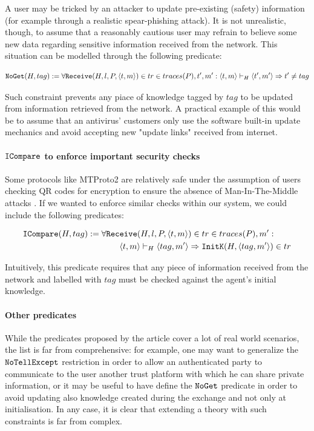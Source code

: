 \documentclass{article}
\newcommand{\mono}[1]{\textrm{\tt #1}}
\begin{document}
A user may be tricked by an attacker to update pre-existing (safety) information (for example through a realistic spear-phishing attack). It is not unrealistic, though, to assume that a reasonably cautious user may refrain to believe some new data regarding sensitive information received from the network. This situation can be modelled through the following predicate:

\begin{equation*}
    \mono{NoGet}(H,tag) := \forall \mono{Receive}(H,l,P,\langle t,m \rangle) \in tr \in traces(P), t', m' : \langle t, m \rangle \vdash_H \langle t', m' \rangle \Rightarrow t' \not = tag
\end{equation*}

Such constraint prevents any piace of knowledge tagged by $tag$ to be updated from information retrieved from the network. A practical example of this would be to assume that an antivirus' customers only use the software built-in update mechanics and avoid accepting new "update links" received from internet.

\paragraph{$\mono{ICompare}$ to enforce important security checks}

Some protocols like MTProto2 are relatively safe under the assumption of users checking QR codes for encryption to ensure the absence of Man-In-The-Middle attacks \cite{Miculan_2023}. If we wanted to enforce similar checks within our system, we could include the following predicates:

\begin{align*}
    \mono{ICompare}(H,tag) := \forall \mono{Rec}&\mono{eive}(H,l,P,\langle t,m \rangle) \in tr \in traces(P), m' : \\
    &\langle t,m \rangle \vdash_H \langle tag,m' \rangle \Rightarrow \mono{InitK}(H, \langle tag,m' \rangle) \in tr
\end{align*}

Intuitively, this predicate requires that any piece of information received from the network and labelled with $tag$ must be checked against the agent's initial knowledge.

\paragraph{Other predicates}

While the predicates proposed by the article cover a lot of real world scenarios, the list is far from comprehensive: for example, one may want to generalize the $\mono{NoTellExcept}$ restriction in order to allow an authenticated party to communicate to the user another trust platform with which he can share private information, or it may be useful to have define the $\mono{NoGet}$ predicate in order to avoid updating also knowledge created during the exchange and not only at initialisation. In any case, it is clear that extending a theory with such constraints is far from complex.
\end{document}
